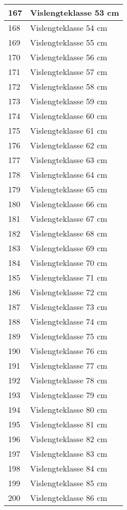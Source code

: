 \documentclass[
]{book}
\begin{document}
\begin{table}
\begin{tabular}[t]{l|l}
\hline
167 & Vislengteklasse 53 cm\\
\hline
168 & Vislengteklasse 54 cm\\
\hline
169 & Vislengteklasse 55 cm\\
\hline
170 & Vislengteklasse 56 cm\\
\hline
171 & Vislengteklasse 57 cm\\
\hline
172 & Vislengteklasse 58 cm\\
\hline
173 & Vislengteklasse 59 cm\\
\hline
174 & Vislengteklasse 60 cm\\
\hline
175 & Vislengteklasse 61 cm\\
\hline
176 & Vislengteklasse 62 cm\\
\hline
177 & Vislengteklasse 63 cm\\
\hline
178 & Vislengteklasse 64 cm\\
\hline
179 & Vislengteklasse 65 cm\\
\hline
180 & Vislengteklasse 66 cm\\
\hline
181 & Vislengteklasse 67 cm\\
\hline
182 & Vislengteklasse 68 cm\\
\hline
183 & Vislengteklasse 69 cm\\
\hline
184 & Vislengteklasse 70 cm\\
\hline
185 & Vislengteklasse 71 cm\\
\hline
186 & Vislengteklasse 72 cm\\
\hline
187 & Vislengteklasse 73 cm\\
\hline
188 & Vislengteklasse 74 cm\\
\hline
189 & Vislengteklasse 75 cm\\
\hline
190 & Vislengteklasse 76 cm\\
\hline
191 & Vislengteklasse 77 cm\\
\hline
192 & Vislengteklasse 78 cm\\
\hline
193 & Vislengteklasse 79 cm\\
\hline
194 & Vislengteklasse 80 cm\\
\hline
195 & Vislengteklasse 81 cm\\
\hline
196 & Vislengteklasse 82 cm\\
\hline
197 & Vislengteklasse 83 cm\\
\hline
198 & Vislengteklasse 84 cm\\
\hline
199 & Vislengteklasse 85 cm\\
\hline
200 & Vislengteklasse 86 cm\\

\end{tabular}
\end{table}
\end{document}
